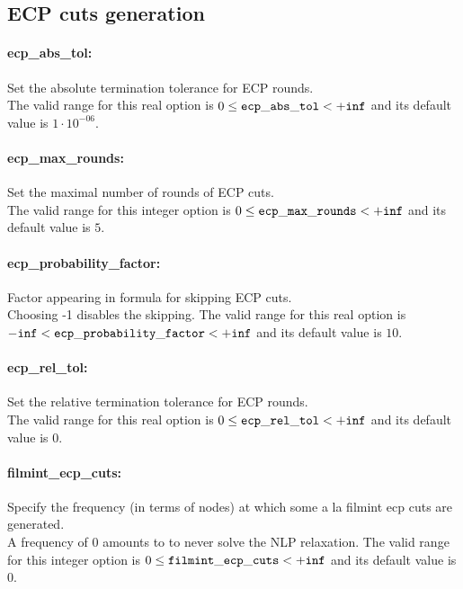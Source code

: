 \subsection{ECP cuts generation}
\label{sec:ECPcutsgeneration}
\paragraph{ecp\_abs\_tol:}\label{opt:ecp_abs_tol} Set the absolute termination tolerance for ECP rounds. \\
 The valid range for this real option is 
$0 \le {\tt ecp\_abs\_tol } <  {\tt +inf}$
and its default value is $1 \cdot 10^{-06}$.


\paragraph{ecp\_max\_rounds:}\label{opt:ecp_max_rounds} Set the maximal number of rounds of ECP cuts. \\
 The valid range for this integer option is
$0 \le {\tt ecp\_max\_rounds } <  {\tt +inf}$
and its default value is $5$.


\paragraph{ecp\_probability\_factor:}\label{opt:ecp_probability_factor} Factor appearing in formula for skipping ECP cuts. \\
 Choosing -1 disables the skipping. The valid range for this real option is 
${\tt -inf} <  {\tt ecp\_probability\_factor } <  {\tt +inf}$
and its default value is $10$.


\paragraph{ecp\_rel\_tol:}\label{opt:ecp_rel_tol} Set the relative termination tolerance for ECP rounds. \\
 The valid range for this real option is 
$0 \le {\tt ecp\_rel\_tol } <  {\tt +inf}$
and its default value is $0$.


\paragraph{filmint\_ecp\_cuts:}\label{opt:filmint_ecp_cuts} Specify the frequency (in terms of nodes) at which some a la filmint ecp cuts are generated. \\
 A frequency of 0 amounts to to never solve the NLP relaxation. The valid range for this integer option is
$0 \le {\tt filmint\_ecp\_cuts } <  {\tt +inf}$
and its default value is $0$.


